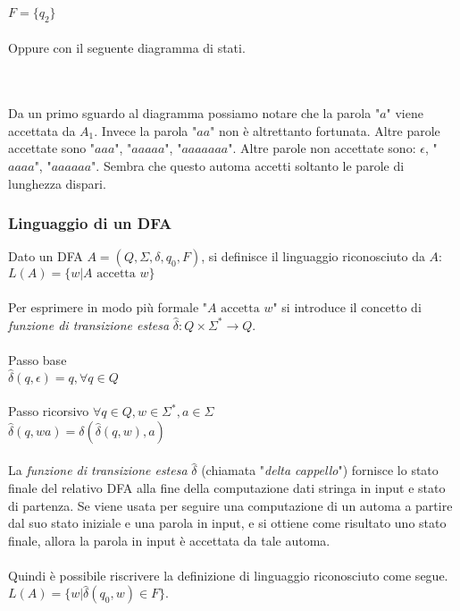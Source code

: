 \documentclass[]{article}
\begin{document}
\mbox{$F = \{ q_2 \}$}
\\
\\
Oppure con il seguente diagramma di stati.
\\
\\
\\
Da un primo sguardo al diagramma possiamo notare che la parola "\mbox{$a$}" viene accettata da \mbox{$A_1$}.
Invece la parola "\mbox{$aa$}" non è altrettanto fortunata. Altre parole accettate sono "\mbox{$aaa$}",
"\mbox{$aaaaa$}", "\mbox{$aaaaaaa$}".
Altre parole non accettate sono: \mbox{$\epsilon$}, "\mbox{$aaaa$}", "\mbox{$aaaaaa$}". Sembra che questo automa
accetti soltanto le parole di lunghezza dispari.



\subsubsection{Linguaggio di un DFA}

Dato un DFA \mbox{$A = (Q, \Sigma, \delta, q_0, F)$}, si definisce il linguaggio riconosciuto da \mbox{$A$}:
\\

\mbox{$L(A) = \{ w | A \text{ accetta } w \}$}
\\
\\
Per esprimere in modo più formale "\mbox{$A \text{ accetta } w$}" si introduce il concetto di
\textit{funzione di transizione estesa} \mbox{$\hat\delta \colon Q \times \Sigma^* \to Q$}.
\\
\\
Passo base
\\
\mbox{$\hat\delta(q, \epsilon) = q, \forall q \in Q$}
\\
\\
Passo ricorsivo \mbox{$\forall q \in Q, w \in \Sigma^*, a \in \Sigma$}
\\
\mbox{$\hat\delta(q, wa) = \delta(\hat\delta(q, w), a)$}
\\
\\
La \textit{funzione di transizione estesa} \mbox{$\hat\delta$} (chiamata "\textit{delta cappello}") fornisce
lo stato finale del relativo DFA alla fine della computazione dati stringa in input e stato di partenza.
Se viene usata per seguire una computazione di un automa a partire dal suo stato iniziale e una parola in
input, e si ottiene come risultato uno stato finale, allora la parola in input è accettata da tale automa.
\\
\\
Quindi è possibile riscrivere la definizione di linguaggio riconosciuto come segue.
\\
\mbox{$L(A) = \{ w | \hat\delta(q_0, w) \in F \}$}.
\end{document}
